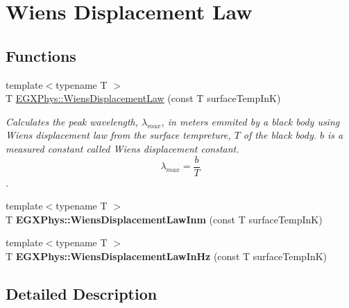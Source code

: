 \hypertarget{group___e_g_x_phys-_electrodynamics-_black_body-_wiens_displacement_law}{}\section{Wien\textquotesingle{}s Displacement Law}
\label{group___e_g_x_phys-_electrodynamics-_black_body-_wiens_displacement_law}
\subsection*{Functions}
\begin{DoxyCompactItemize}
\item 
{\footnotesize template$<$typename T $>$ }\\T \mbox{\hyperlink{group___e_g_x_phys-_electrodynamics-_black_body-_wiens_displacement_law_ga8f89ce1baac45a1717f604255d04af44}{E\+G\+X\+Phys\+::\+Wiens\+Displacement\+Law}} (const T surface\+Temp\+InK)
\begin{DoxyCompactList}\small\item\em Calculates the peak wavelength, $\lambda_{max}$, in meters emmited by a black body using Wien\textquotesingle{}s displacement law from the surface tempreture, $T$ of the black body. $b$ is a measured constant called Wien\textquotesingle{}s displacement constant. \[\lambda_{max} = \dfrac{b}{T} \]. \end{DoxyCompactList}\item 
\mbox{\label{group___e_g_x_phys-_electrodynamics-_black_body-_wiens_displacement_law_ga126ebb146c31a2371f1d1d001d11c62f}} 
{\footnotesize template$<$typename T $>$ }\\T {\bfseries E\+G\+X\+Phys\+::\+Wiens\+Displacement\+Law\+Inm} (const T surface\+Temp\+InK)
\item 
\mbox{\label{group___e_g_x_phys-_electrodynamics-_black_body-_wiens_displacement_law_gaf09ffbc9b7133c16da786c1609ecf689}} 
{\footnotesize template$<$typename T $>$ }\\T {\bfseries E\+G\+X\+Phys\+::\+Wiens\+Displacement\+Law\+In\+Hz} (const T surface\+Temp\+InK)
\end{DoxyCompactItemize}


\subsection{Detailed Description}


